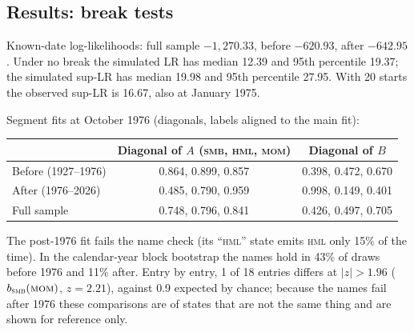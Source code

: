 \documentclass[11pt]{article}
\newcommand{\SMB}{\textsc{smb}}
\newcommand{\HML}{\textsc{hml}}
\newcommand{\MOM}{\textsc{mom}}
\begin{document}
\subsection{Results: break tests}
\begin{center}
\small
{}
\end{center}
\noindent Known-date log-likelihoods: full sample $-1{,}270.33$, before $-620.93$, after $-642.95$. Under no break the simulated LR has median 12.39 and 95th percentile 19.37; the simulated sup-LR has median 19.98 and 95th percentile 27.95. With 20 starts the observed sup-LR is 16.67, also at January 1975.

\noindent Segment fits at October 1976 (diagonals, labels aligned to the main fit):
\begin{center}
\small
\begin{tabular}{lcc}
\toprule
 & Diagonal of $A$ (\SMB, \HML, \MOM) & Diagonal of $B$ \\
\midrule
Before (1927--1976) & 0.864, 0.899, 0.857 & 0.398, 0.472, 0.670 \\
After (1976--2026) & 0.485, 0.790, 0.959 & 0.998, 0.149, 0.401 \\
Full sample & 0.748, 0.796, 0.841 & 0.426, 0.497, 0.705 \\
\bottomrule
\end{tabular}
\end{center}
The post-1976 fit fails the name check (its ``\HML'' state emits \HML{} only 15\% of the time). In the calendar-year block bootstrap the names hold in 43\% of draws before 1976 and 11\% after. Entry by entry, 1 of 18 entries differs at $|z|>1.96$ ($b_{\textsc{smb}}(\textsc{mom})$, $z=2.21$), against 0.9 expected by chance; because the names fail after 1976 these comparisons are of states that are not the same thing and are shown for reference only.
\end{document}
